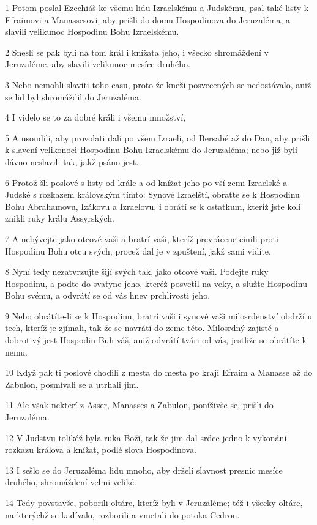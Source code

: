 \par 1 Potom poslal Ezechiáš ke všemu lidu Izraelskému a Judskému, psal také listy k Efraimovi a Manassesovi, aby prišli do domu Hospodinova do Jeruzaléma, a slavili velikunoc Hospodinu Bohu Izraelskému.
\par 2 Snesli se pak byli na tom král i knížata jeho, i všecko shromáždení v Jeruzaléme, aby slavili velikunoc mesíce druhého.
\par 3 Nebo nemohli slaviti toho casu, proto že kneží posvecených se nedostávalo, aniž se lid byl shromáždil do Jeruzaléma.
\par 4 I videlo se to za dobré králi i všemu množství,
\par 5 A usoudili, aby provolati dali po všem Izraeli, od Bersabé až do Dan, aby prišli k slavení velikonoci Hospodinu Bohu Izraelskému do Jeruzaléma; nebo již byli dávno neslavili tak, jakž psáno jest.
\par 6 Protož šli poslové s listy od krále a od knížat jeho po vší zemi Izraelské a Judské s rozkazem královským tímto: Synové Izraelští, obratte se k Hospodinu Bohu Abrahamovu, Izákovu a Izraelovu, i obrátí se k ostatkum, kteríž jste koli znikli ruky králu Assyrských.
\par 7 A nebývejte jako otcové vaši a bratrí vaši, kteríž prevrácene cinili proti Hospodinu Bohu otcu svých, procež dal je v zpuštení, jakž sami vidíte.
\par 8 Nyní tedy nezatvrzujte šijí svých tak, jako otcové vaši. Podejte ruky Hospodinu, a podte do svatyne jeho, kteréž posvetil na veky, a služte Hospodinu Bohu svému, a odvrátí se od vás hnev prchlivosti jeho.
\par 9 Nebo obrátíte-li se k Hospodinu, bratrí vaši i synové vaši milosrdenství obdrží u tech, kteríž je zjímali, tak že se navrátí do zeme této. Milosrdný zajisté a dobrotivý jest Hospodin Buh váš, aniž odvrátí tvári od vás, jestliže se obrátíte k nemu.
\par 10 Když pak ti poslové chodili z mesta do mesta po kraji Efraim a Manasse až do Zabulon, posmívali se a utrhali jim.
\par 11 Ale však nekterí z Asser, Manasses a Zabulon, poníživše se, prišli do Jeruzaléma.
\par 12 V Judstvu tolikéž byla ruka Boží, tak že jim dal srdce jedno k vykonání rozkazu králova a knížat, podlé slova Hospodinova.
\par 13 I sešlo se do Jeruzaléma lidu mnoho, aby drželi slavnost presnic mesíce druhého, shromáždení velmi veliké.
\par 14 Tedy povstavše, poborili oltáre, kteríž byli v Jeruzaléme; též i všecky oltáre, na kterýchž se kadívalo, rozborili a vmetali do potoka Cedron.
